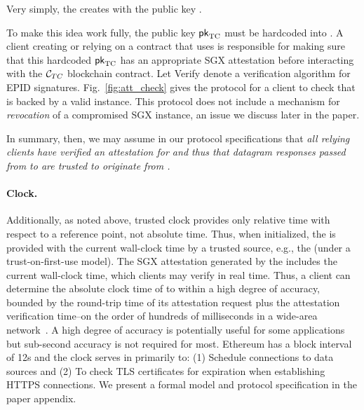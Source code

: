 Very simply, the \encname creates \tcadd with the public key \pkTC. 

To make this idea work fully, the public key ${\sf pk}_{\textrm{TC}}$ must be hardcoded into \tcont. A client creating or relying on a contract that uses \tcont is responsible for making sure that this hardcoded ${\sf pk}_{\textrm{TC}}$ has an appropriate SGX attestation before interacting with the ${\cal C}_{TC}$  blockchain contract.  Let {\sf Verify} denote a verification algorithm for EPID signatures. Fig.~\ref{fig:att_check} gives the protocol for a client to check that \tcont is backed by a valid \encname instance. This protocol does not include a mechanism for \emph{revocation} of a compromised SGX instance, an issue we discuss later in the paper.

In summary, then, we may assume in our protocol specifications that {\em all relying clients have verified an attestation for \encname and thus that datagram responses passed from \tcadd to \tcont are trusted to originate from \engine.} 


\paragraph{\bf Clock.}
Additionally, as noted above, trusted clock provides only relative time with  respect to a reference point, not absolute time. Thus, when initialized, the \encname is provided with the current wall-clock time by a trusted source, e.g., the \medname (under a trust-on-first-use model). The SGX attestation generated by the \encname includes the current wall-clock time, which clients may verify in real time. Thus, a client can determine the absolute clock time of \encname to within a high degree of accuracy, bounded by the round-trip time of its attestation request plus the attestation verification time--on the order of hundreds of milliseconds in a wide-area network~\cite{}. A high degree of accuracy is potentially useful for some applications but sub-second accuracy is not required for most. Ethereum has a block interval of 12s and the clock serves in \tc primarily to: (1) Schedule connections to data sources and (2) To check TLS certificates for expiration when establishing HTTPS connections.
 We present a formal model and protocol specification in the paper appendix.



